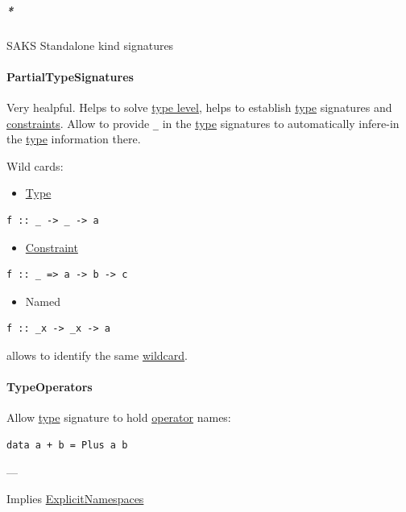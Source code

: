 \documentclass[a4paper,14pt,oneside]{book}
\begin{document}
\subparagraph{\emph{*}}
\label{sec:orgd6b7b22}

\label{orgf124a9b}SAKS
\label{orgdc40264}Standalone kind signatures

\paragraph{\label{org545d421}PartialTypeSignatures}
\label{sec:org10dd0c8}
Very healpful. Helps to solve \hyperref[orgb902c97]{type level}, helps to establish \hyperref[org4e3af4c]{type} signatures and \hyperref[org7ab0abf]{constraints}.
Allow to provide \texttt{\_} in the \hyperref[org4e3af4c]{type} signatures to automatically infere-in the \hyperref[org4e3af4c]{type} information there.

Wild cards:
\begin{itemize}
\item \hyperref[org4e3af4c]{Type}
\end{itemize}
\begin{verbatim}
f :: _ -> _ -> a
\end{verbatim}

\begin{itemize}
\item \hyperref[org5071db7]{Constraint}
\end{itemize}
\begin{verbatim}
f :: _ => a -> b -> c
\end{verbatim}

\begin{itemize}
\item Named
\end{itemize}
\begin{verbatim}
f :: _x -> _x -> a
\end{verbatim}
allows to identify the same \hyperref[orgb65c8fa]{wildcard}.

\paragraph{\label{orge526a6d}TypeOperators}
\label{sec:org9a465f0}
Allow \hyperref[org4e3af4c]{type} signature to hold \hyperref[orgb7d83ce]{operator} names:

\begin{verbatim}
data a + b = Plus a b
\end{verbatim}

---

Implies	\hyperref[org72f86d3]{ExplicitNamespaces}
\end{document}
